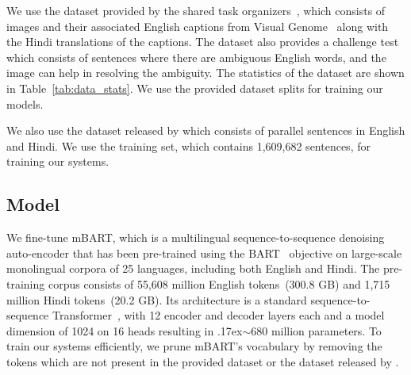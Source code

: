 \documentclass[11pt,a4paper]{article}
\newcommand{\approximately}{{\raise.17ex\hbox{$\scriptstyle\sim$}}}
\begin{document}
\begin{table}
\centering
{}
\caption{The statistics of the provided dataset. The average number of tokens in the source and target language are reported for all the sentence pairs.}
\label{tab:data_stats}
\end{table} 
We use the dataset provided by the shared task organizers~\citep{hindi-visual-genome:2019}, which consists of images and their associated English captions from Visual Genome~\citep{10.1007/s11263-016-0981-7} along with the Hindi translations of the captions. The dataset also provides a challenge test which consists of sentences where there are ambiguous English words, and the image can help in resolving the ambiguity. The statistics of the dataset are shown in Table~\ref{tab:data_stats}. We use the provided dataset splits for training our models.

We also use the dataset released by \citet{kunchukuttan-etal-2018-iit} which consists of parallel sentences in English and Hindi. We use the training set, which contains 1,609,682 sentences, for training our systems.

\subsection{Model}

We fine-tune mBART, which is a multilingual sequence-to-sequence denoising auto-encoder that has been pre-trained using the BART~\citep{lewis-etal-2020-bart} objective on large-scale monolingual corpora of 25 languages, including both English and Hindi. The pre-training corpus consists of 55,608 million English tokens~(300.8 GB) and 1,715 million Hindi tokens~(20.2 GB). Its architecture is a standard sequence-to-sequence Transformer~\citep{NIPS2017_3f5ee243}, with 12 encoder and decoder layers each and a model dimension of 1024 on 16 heads resulting in \approximately680 million parameters. To train our systems efficiently, we prune mBART's vocabulary by removing the tokens which are not present in the provided dataset or the dataset released by \citet{kunchukuttan-etal-2018-iit}.
\end{document}
